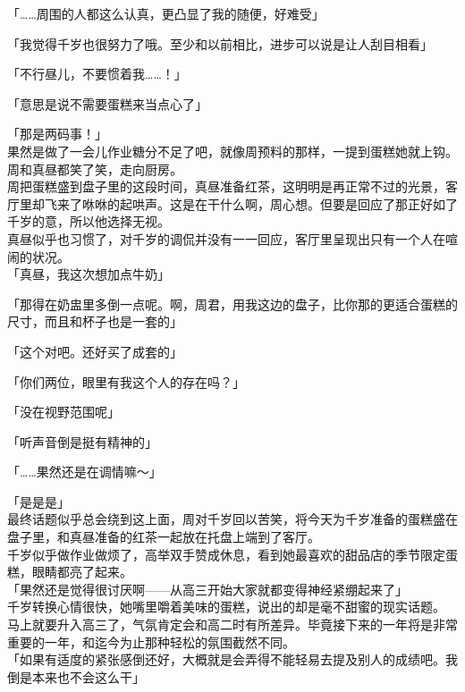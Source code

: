 「……周围的人都这么认真，更凸显了我的随便，好难受」

「我觉得千岁也很努力了哦。至少和以前相比，进步可以说是让人刮目相看」

「不行昼儿，不要惯着我……！」

「意思是说不需要蛋糕来当点心了」

「那是两码事！」\\

果然是做了一会儿作业糖分不足了吧，就像周预料的那样，一提到蛋糕她就上钩。周和真昼都笑了笑，走向厨房。\\

周把蛋糕盛到盘子里的这段时间，真昼准备红茶，这明明是再正常不过的光景，客厅里却飞来了咻咻的起哄声。这是在干什么啊，周心想。但要是回应了那正好如了千岁的意，所以他选择无视。\\

真昼似乎也习惯了，对千岁的调侃并没有一一回应，客厅里呈现出只有一个人在喧闹的状况。\\

「真昼，我这次想加点牛奶」

「那得在奶盅里多倒一点呢。啊，周君，用我这边的盘子，比你那的更适合蛋糕的尺寸，而且和杯子也是一套的」

「这个对吧。还好买了成套的」

「你们两位，眼里有我这个人的存在吗？」

「没在视野范围呢」

「听声音倒是挺有精神的」

「……果然还是在调情嘛～」

「是是是」\\

最终话题似乎总会绕到这上面，周对千岁回以苦笑，将今天为千岁准备的蛋糕盛在盘子里，和真昼准备的红茶一起放在托盘上端到了客厅。\\

千岁似乎做作业做烦了，高举双手赞成休息，看到她最喜欢的甜品店的季节限定蛋糕，眼睛都亮了起来。\\

「果然还是觉得很讨厌啊——从高三开始大家就都变得神经紧绷起来了」\\

千岁转换心情很快，她嘴里嚼着美味的蛋糕，说出的却是毫不甜蜜的现实话题。\\

马上就要升入高三了，气氛肯定会和高二时有所差异。毕竟接下来的一年将是非常重要的一年，和迄今为止那种轻松的氛围截然不同。\\

「如果有适度的紧张感倒还好，大概就是会弄得不能轻易去提及别人的成绩吧。我倒是本来也不会这么干」

